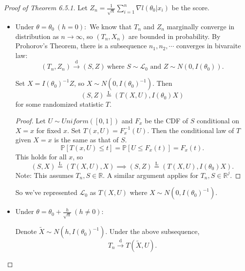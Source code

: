 \documentclass[a4paper]{article}
\begin{document}
\begin{proof}[Proof of Theorem 6.5.1]
	Let $Z_n = \frac{1}{\sqrt{n}} \sum\limits_{i=1}^n \nabla l(\theta_0|x_i)$ be the score.
	\begin{itemize}[leftmargin=*]
		\item Under $\theta = \theta_0 \ (h = 0):$ We know that $T_n$ and $Z_n$ marginally converge in distribution as $n \to \infty$, so $(T_n,X_n)$ are bounded in probability. By Prohorov's Theorem, there is a subsequence $n_1,n_2,\cdots$ converges in bivaraite law:
		\begin{equation*}
			(T_n,Z_n) \stackrel{\text{d}}{\longrightarrow} (S,Z) \ \text{where } S \sim \mathcal{L}_0 \text{ and } Z \sim N(0,I(\theta_0)).
		\end{equation*}
		\begin{claim}
			Set $X = I(\theta_0)^{-1} Z$, so $X \sim N(0,I(\theta_0)^{-1})$. Then
			\begin{equation*}
				(S,Z) \stackrel{\text{L}}{=} \left(T(X,U), I(\theta_0)X\right)
			\end{equation*}
			for some randomized statistic $T$.
		\end{claim}	
		\begin{proof}
			 Let $U \sim Uniform([0,1])$ and $F_x$ be the CDF of $S$ conditional on $X = x$ for fixed $x$. Set $T(x,U) = F_x^{-1}(U)$. Then the conditional law of $T$ given $X =x$ is the same as that of $S$. 
			\begin{equation*}
				\mathbb{P}[T(x,U) \leq t] = \mathbb{P}[U \leq F_x(t)] = F_x(t).
			\end{equation*}
			This holds for all $x$, so
			\begin{equation*}
				(S,X) \stackrel{\text{L}}{=} \left(T(X,U), X\right) \implies (S,Z) \stackrel{\text{L}}{=} \left(T(X,U), I(\theta_0)X\right).
			\end{equation*}
			Note: This assumes $T_n,S \in \mathbb{R}$. A similar argument applies for $T_n,S \in \mathbb{R}^{j}$.
		\end{proof}
		So we've represented $\mathcal{L}_0$ as $T(X,U)$ where $X \sim N(0,I(\theta_0)^{-1})$.
		\item Under $\theta = \theta_0 + \frac{h}{\sqrt{n}} \ (h \neq 0):$
		\begin{claim}
			Denote $\tilde{X} \sim N(h,I(\theta_0)^{-1})$. Under the above subsequence,
			\begin{equation*}
				T_n \stackrel{\text{d}}{\longrightarrow} T \left(\tilde{X},U\right).
			\end{equation*}
		\end{claim}
	

\end{itemize}
\end{proof}
\end{document}
